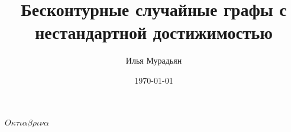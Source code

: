 \documentclass[a4paper,12pt]{article}
\title{Бесконтурные случайные графы с нестандартной достижимостью}
\author{Илья Мурадьян}
\date{\today}
\theoremstyle{definition}
\begin{document}
	$O\kappa\tau\iota\alpha\beta\rho\iota\nu\alpha$
\end{document}
